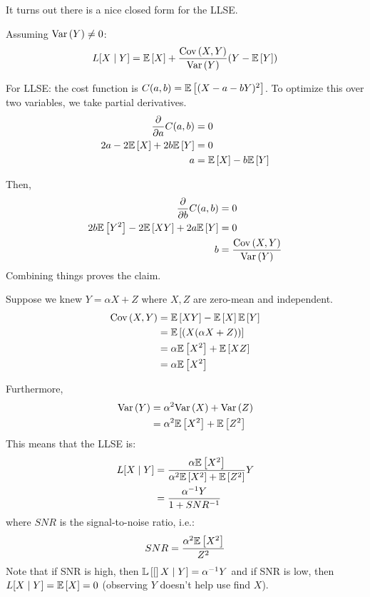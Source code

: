 It turns out there is a nice closed form for the LLSE.
\begin{theorem}
    Assuming $\text{Var}\left( Y \right) \neq 0$:
    \[ L[X \mid Y] = \mathbb{E}\left[ X \right] + \frac{\text{Cov}\left( X, Y \right)}{\text{Var}\left( Y \right)} (Y - \mathbb{E}\left[ Y \right]) \]

    \begin{proof*}
        For LLSE: the cost function is $C(a, b) = \mathbb{E}\left[ (X - a - bY)^2 \right]$.
        To optimize this over two variables, we take partial derivatives.
        \begin{align*}
            \frac{\partial}{\partial a} C(a, b) &= 0 \\
            2a - 2 \mathbb{E}\left[ X \right] + 2b \mathbb{E}\left[ Y \right] &= 0 \\
            a &= \mathbb{E}\left[ X \right] - b \mathbb{E}\left[ Y \right]
        \end{align*}

        Then,
        \begin{align*}
            \frac{\partial}{\partial b} C(a, b) &= 0 \\
            2b \mathbb{E}\left[ Y^2 \right] - 2 \mathbb{E}\left[ XY \right] + 2a \mathbb{E}\left[ Y \right] &= 0 \\
            b &= \frac{\text{Cov}\left( X, Y \right)}{\text{Var}\left( Y \right)}
        \end{align*}
        Combining things proves the claim.
    \end{proof*}
\end{theorem}

\begin{example}
    Suppose we knew $Y = \alpha X + Z$ where $X,Z$ are zero-mean and independent.
    \begin{align*}
        \text{Cov}\left( X, Y \right) &= \mathbb{E}\left[ XY \right] - \mathbb{E}\left[ X \right]\mathbb{E}\left[ Y \right] \\
        &= \mathbb{E}\left[ (X(\alpha X + Z)) \right] \\
        &= \alpha \mathbb{E}\left[ X^2 \right] + \mathbb{E}\left[ XZ \right] \\
        &= \alpha \mathbb{E}\left[ X^2 \right]
    \end{align*}

    Furthermore,
    \begin{align*}
        \text{Var}\left( Y \right) &= \alpha^2 \text{Var}\left( X \right) + \text{Var}\left( Z \right) \\
        &= \alpha^2 \mathbb{E}\left[ X^2 \right] + \mathbb{E}\left[ Z^2 \right] \\
    \end{align*}
    This means that the LLSE is:
    \begin{align*}
        L[X \mid Y] &= \frac{\alpha \mathbb{E}\left[ X^2 \right]}{\alpha^2 \mathbb{E}\left[ X^2 \right] + \mathbb{E}\left[ Z^2 \right]} Y \\
        &= \frac{\alpha^{-1} Y}{1 + SNR^{-1}}
    \end{align*}
    where $SNR$ is the signal-to-noise ratio, i.e.:
    \[ SNR = \frac{\alpha^2 \mathbb{E}\left[ X^2 \right]}{Z^2} \]
    Note that if SNR is high, then $\mathbb{L}\left[ [ \right]X \mid Y] = \alpha^{-1} Y$ and if SNR is low, then $L[X \mid Y] = \mathbb{E}\left[ X \right] = 0$ (observing $Y$ doesn't help use find $X$).
\end{example}


